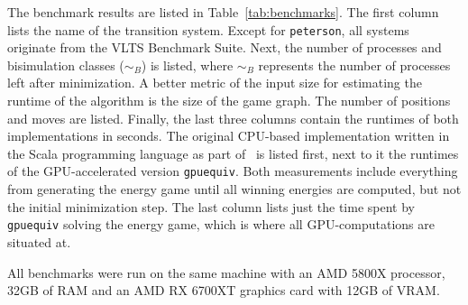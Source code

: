 The benchmark results are listed in Table~\ref{tab:benchmarks}.
The first column lists the name of the transition system.
Except for \texttt{peterson}, all systems originate from the VLTS Benchmark
Suite.
Next, the number of processes and bisimulation classes ($\sim_B$) is listed,
where $\sim_B$ represents the number of processes left after minimization.
A better metric of the input size for estimating the runtime of the algorithm
is the size of the game graph.
The number of positions and moves are listed.
Finally, the last three columns contain the runtimes of both implementations in
seconds.
The original CPU-based implementation written in the Scala programming
language as part of~\cite{bisping2023process} is listed first,
next to it the runtimes of the GPU-accelerated version \texttt{gpuequiv}.
Both measurements include everything from generating the energy game until
all winning energies are computed, but not the initial minimization step.
The last column lists just the time spent by \texttt{gpuequiv} solving the
energy game, which is where all GPU-computations are situated at.

All benchmarks were run on the same machine with an AMD 5800X processor,
32GB of RAM and an AMD RX 6700XT graphics card with 12GB of VRAM\@.

